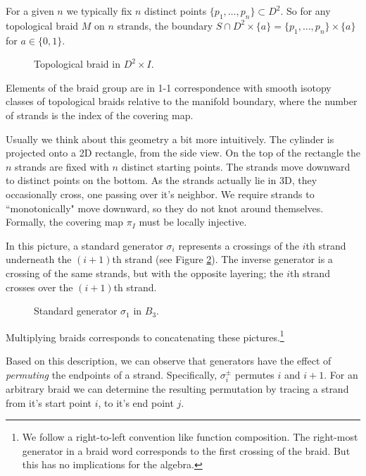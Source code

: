 \documentclass[12pt]{thesis}
\begin{document}
For a given $n$ we typically fix $n$ distinct points $\{ p_{1}, \ldots, p_{n} \} \subset D^{2}$.
So for any topological braid $M$ on $n$ strands, the boundary $S \cap D^{2} \times \{ a \} = \{ p_{1}, \ldots, p_{n} \} \times \{ a \}$ for $a \in \{ 0, 1 \}$.

\begin{figure}[h]
    \centering
    \def\svgwidth{10cm}
    
    \caption{Topological braid in $D^{2} \times I$.}
    \label{fig:topological-braid}
\end{figure}

Elements of the braid group are in 1-1 correspondence with smooth isotopy classes of topological braids
relative to the manifold boundary,
where the number of strands is the index of the covering map.

Usually we think about this geometry a bit more intuitively.
The cylinder is projected onto a 2D 
rectangle, from the side view.
On the top of the rectangle
the $n$ strands are fixed with $n$ distinct starting points.
The strands move downward
to distinct points on the bottom.
As the strands actually lie in 3D,
they occasionally cross, one passing over it's neighbor.
We require strands to ``monotonically" move downward,
so they do not knot around themselves.
Formally, the covering map $\pi_{I}$ must be locally injective.

In this picture,
a standard generator $\sigma_{i}$ represents a crossings of the $i$th strand
underneath the $(i + 1)$th strand (see Figure \ref{fig:standard-generator}).
The inverse generator is a crossing of the same strands, but with the opposite layering;
the $i$th strand crosses over the $(i + 1)$th strand.
\begin{figure}[h]
    \centering
    \def\svgwidth{4cm}
    
    \caption{Standard generator $\sigma_{1}$ in $B_{3}$.}
    \label{fig:standard-generator}
\end{figure}
Multiplying braids corresponds to concatenating these pictures.\footnote{We follow a right-to-left convention like function composition. The right-most generator
in a braid word corresponds to the first crossing of the braid.
But this has no implications for the algebra.}

Based on this description, we can observe that generators
have the effect of \textit{permuting} the endpoints of a strand.
Specifically, $\sigma_{i}^{\pm}$ permutes $i$ and $i+1$.
For an arbitrary braid we can determine
the resulting permutation by tracing a strand from it's start point $i$, to it's end point $j$.
\end{document}
